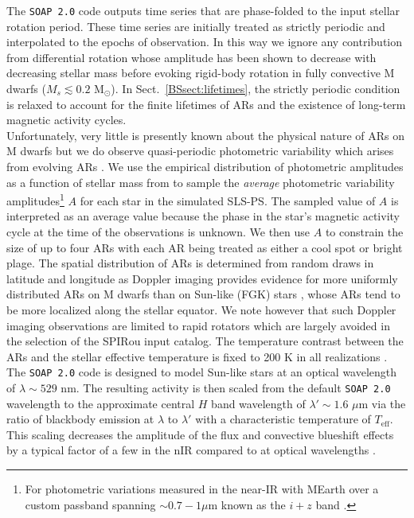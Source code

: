 The \texttt{SOAP 2.0} code outputs time series that are phase-folded to the input 
stellar rotation period. These time series are initially treated as strictly periodic
and interpolated to the epochs of observation. In
this way we ignore any contribution from differential rotation whose amplitude has been shown to
decrease with decreasing stellar mass \citep{donati08, morin08, kitchatinov11}
before evoking rigid-body rotation in fully convective M dwarfs
($M_s \lesssim 0.2$ M$_{\odot}$). In Sect.~\ref{BSsect:lifetimes},
the strictly periodic condition is relaxed to account for the finite lifetimes of ARs and the existence of
long-term magnetic activity cycles. \\

Unfortunately, very little is presently known about the physical nature of ARs on M dwarfs but we do observe
quasi-periodic photometric variability which arises from evolving ARs \citep{oneal05}. We use the
empirical distribution of photometric amplitudes as a function of stellar mass from \cite{newton16a} to sample
the \emph{average} photometric variability amplitudes\footnote{For photometric variations measured in the near-IR
  with MEarth over a custom passband spanning $\sim 0.7-1 \mu$m known as the $i+z$ band \citep{nutzman08}.}
$A$ for each star in the simulated SLS-PS. The sampled value of $A$ is interpreted as an
average value because the phase in the star's magnetic activity cycle at the time of the \cite{newton16a}
observations is unknown. We then use $A$ to constrain the size of up to four ARs with each AR being treated as either
a cool spot or bright plage. The spatial distribution of
ARs is determined from random draws in latitude and longitude as  
Doppler imaging provides evidence for more uniformly distributed ARs on M dwarfs than on
Sun-like (FGK) stars \citep{barnes01, barnes04}, whose ARs tend to be more localized along the
stellar equator. We note however that such Doppler imaging observations are limited to rapid rotators
which are largely avoided in the selection of the SPIRou input catalog. 
The temperature contrast between the ARs and the stellar effective
temperature is fixed to 200 K in all realizations \citep{berdyugina05}. The \texttt{SOAP 2.0} code is
designed to model Sun-like stars at an optical wavelength of $\lambda \sim 529$ nm.
The resulting activity is then scaled from the default \texttt{SOAP 2.0} wavelength to the approximate
central $H$ band wavelength of $\lambda' \sim 1.6$ $\mu$m via the ratio of blackbody emission at $\lambda$ to $\lambda'$
with a characteristic temperature of $T_{\text{eff}}$. 
This scaling decreases the amplitude of the flux and convective blueshift effects by a typical
factor of a few in the nIR compared to at optical wavelengths
\citep{martin06, huelamo08, prato08, reiners10, mahmud11}.


